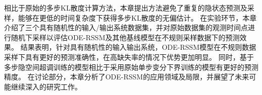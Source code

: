 相比于原始的多步KL散度计算方法，本章提出方法避免了重复的隐状态预测及采样，能够在更低的时间复杂度下获得多步KL散度的无偏估计。
在实验环节，本章介绍了三个具有随机性的输入/输出系统数据集，并对原始数据集的观测时间点进行随机下采样以评估ODE-RSSM及其他基线模型在不规则采样数据下的预测效果。
结果表明，针对具有随机性的输入输出系统，ODE-RSSM模型在不规则数据采样下具有更好的预测准确性，在高缺失率的情况下优势更加明显。
同时，基于多步隐空间超调训练的模型相比于采用原始单步变分下界训练的模型有更好的预测精度。
在讨论部分，本章分析了ODE-RSSM的应用领域及局限，并展望了未来可能继续深入的研究工作。

